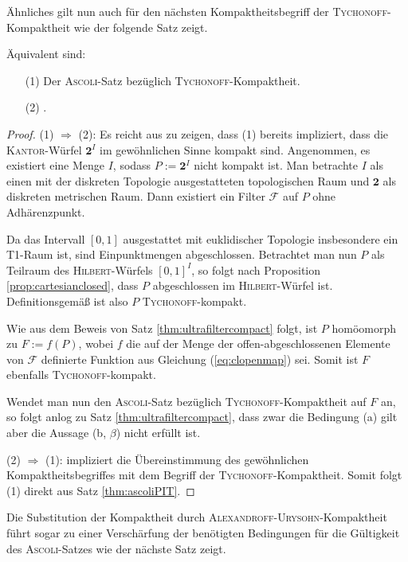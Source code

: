 Ähnliches gilt nun auch für den nächsten Kompaktheitsbegriff der \textsc{Tychonoff}\hyp{}Kompaktheit wie der folgende Satz zeigt.

\begin{thm}
  Äquivalent sind:
  \begin{enumerate}
    \item[(1)] Der \textsc{Ascoli}-Satz bezüglich \textsc{\textsc{Tychonoff}}\hyp{}Kompaktheit.
    \item[(2)] \PIT.
  \end{enumerate}
\end{thm}

\begin{proof}
  (1) $\Rightarrow$ (2): Es reicht aus zu zeigen, dass (1) bereits impliziert, dass die \textsc{Kantor}\hyp{}Würfel $\mathbf{2}^I$ im gewöhnlichen Sinne kompakt sind.
  Angenommen, es existiert eine Menge $I$, sodass $P:= \mathbf{2}^I$ nicht kompakt ist.
  Man betrachte $I$ als einen mit der diskreten Topologie ausgestatteten topologischen Raum und $\mathbf{2}$ als diskreten metrischen Raum.
  Dann existiert ein Filter $\mathcal{F}$ auf $P$ ohne Adhärenzpunkt.

  Da das Intervall $[0,1]$ ausgestattet mit euklidischer Topologie insbesondere ein T1\hyp{}Raum ist, sind Einpunktmengen abgeschlossen.
  Betrachtet man nun $P$ als Teilraum des \textsc{Hilbert}\hyp{}Würfels $[0,1]^I$, so folgt nach Proposition \ref{prop:cartesianclosed}, dass $P$ abgeschlossen im \textsc{Hilbert}\hyp{}Würfel ist.
  Definitionsgemäß ist also $P$ \textsc{Tychonoff}\hyp{}kompakt.

  Wie aus dem Beweis von Satz \ref{thm:ultrafiltercompact} folgt, ist $P$ homöomorph zu $F:= f(P)$, wobei $f$ die auf der Menge der offen\hyp{}abgeschlossenen Elemente von $\mathcal{F}$ definierte Funktion aus Gleichung (\ref{eq:clopenmap}) sei.
  Somit ist $F$ ebenfalls \textsc{Tychonoff}\hyp{}kompakt.

  Wendet man nun den \textsc{Ascoli}\hyp{}Satz bezüglich \textsc{Tychonoff}\hyp{}Kompaktheit auf $F$ an, so folgt anlog zu Satz \ref{thm:ultrafiltercompact}, dass zwar die Bedingung (a) gilt aber die Aussage (b, $\beta$) nicht erfüllt ist.

  (2) $\Rightarrow$ (1): \PIT impliziert die Übereinstimmung des gewöhnlichen Kompaktheitsbegriffes mit dem Begriff der \textsc{Tychonoff}\hyp{}Kompaktheit. Somit folgt (1) direkt aus Satz \ref{thm:ascoliPIT}.
\end{proof}

Die Substitution der Kompaktheit durch \textsc{Alexandroff}\hyp{}\textsc{Urysohn}\hyp{}Kompaktheit führt sogar zu einer Verschärfung der benötigten Bedingungen für die Gültigkeit des \textsc{Ascoli}\hyp{}Satzes wie der nächste Satz zeigt.

